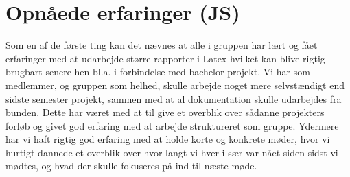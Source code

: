\chapter{Opnåede erfaringer (JS)}

Som en af de første ting kan det nævnes at alle i gruppen har lært og fået erfaringer med at udarbejde større rapporter i Latex hvilket kan blive rigtig brugbart senere hen bl.a. i forbindelse med bachelor projekt.\newline
Vi har som medlemmer, og gruppen som helhed, skulle arbejde noget mere selvstændigt end sidste semester projekt, sammen med at al dokumentation skulle udarbejdes fra bunden. Dette har været med at til give et overblik over sådanne projekters forløb og givet god erfaring med at arbejde struktureret som gruppe. Ydermere har vi haft rigtig god erfaring med at holde korte og konkrete møder, hvor vi hurtigt dannede et overblik over hvor langt vi hver i sær var nået siden sidst vi mødtes, og hvad der skulle fokuseres på ind til næste møde.

